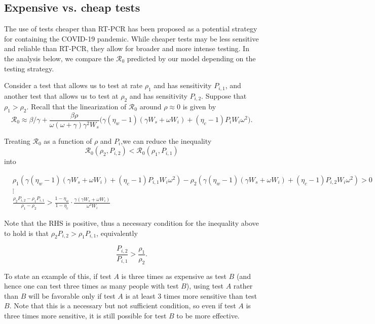 \documentclass[12pt]{article}
\newcommand{\Rnum}{\mathcal{R}_0}
\theoremstyle{definition} %
\begin{document}
\subsection{Expensive vs. cheap tests}

The use of tests cheaper than RT-PCR has been proposed as a potential strategy for containing the COVID-19 pandemic. While cheaper tests may be less sensitive and reliable than RT-PCR, they allow for broader and more intense testing. In the analysis below, we compare the $\Rnum$ predicted by our model depending on the testing strategy. 

Consider a test that allows us to test at rate $\rho_1$ and has sensitivity $P_{i,1}$, and another test that allows us to test at $\rho_2$ and has sensitivity $P_{i,2}$. Suppose that $\rho_1 > \rho_2$. Recall that the linearization of $\Rnum$ around $\rho \approx 0$ is given by $$\Rnum \approx \beta/\gamma + \frac{\beta \rho}{\omega (\omega+\gamma) \gamma^2 W_s} \Big(\gamma(\eta_w-1)(\gamma W_s+\omega W_i) + (\eta_c -1)P_iW_i \omega^2 \Big).$$


Treating $\Rnum$ as a function of $\rho$ and $P_i$,we can reduce the inequality $$\Rnum(\rho_2, P_{i,2}) < \Rnum(\rho_1, P_{i,1})$$ into 

\begin{align}\label{eq:rho1vsrho2}
    &\rho_1\left(\gamma(\eta_w-1)(\gamma W_s + \omega W_i) + (\eta_c-1)P_{i, 1}W_i\omega^2\right) - \rho_2\left(\gamma(\eta_w-1)(\gamma W_s + \omega W_i) + (\eta_c-1)P_{i, 2}W_i\omega^2\right) > 0 \nonumber \\
    &\vdots \nonumber \\
    &\frac{\rho_2P_{i, 2}-\rho_1P_{i, 1} }{\rho_1-\rho_2} > \frac{1-\eta_w}{1-\eta_c}\cdot \frac{\gamma(\gamma W_s + \omega W_i)}{\omega^2 W_i}
\end{align}

Note that the RHS is positive, thus a necessary condition for the inequality above to hold is that $\rho_2P_{i,2} > \rho_1P_{i,1}$, equivalently 

\begin{equation}
\frac{P_{i,2}}{P_{i,1}} > \frac{\rho_1}{\rho_2}.
\end{equation}

To state an example of this, if test $A$ is three times as expensive as test $B$ (and hence one can test three times as many people with test $B$), using test $A$ rather than $B$ will be favorable only if test $A$ is at least 3 times more sensitive than test $B$. Note that this is a necessary but not sufficient condition, so even if test $A$ is three times more sensitive, it is still possible for test $B$ to be more effective. 
\end{document}
